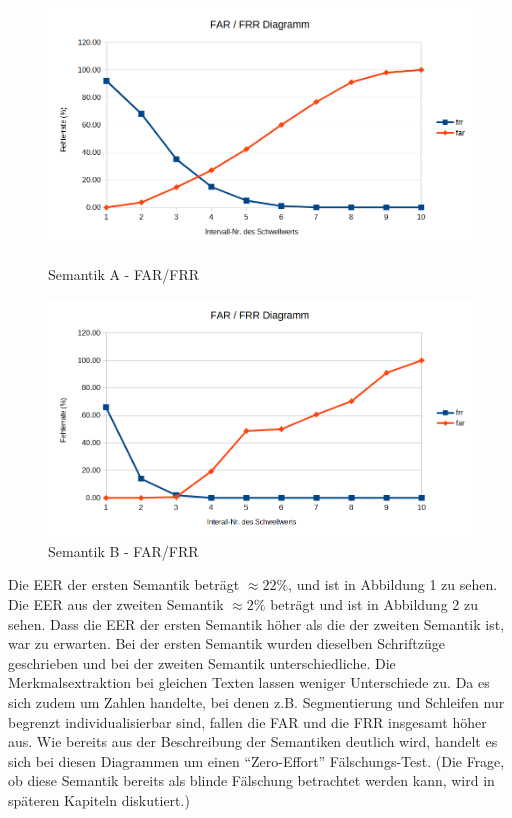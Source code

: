 \documentclass{article}
\begin{document}
\begin{figure}[ht]
	\centering
	\begin{minipage}{0.4\textwidth}
		\centering
		\includegraphics[width=\linewidth]{assets/a-eer}
		\caption{Semantik A - FAR/FRR}
	\end{minipage}%
	\hspace{1em}
	\begin{minipage}{.4\textwidth}
		\centering
		\includegraphics[width=\linewidth]{assets/b-eer}
		\caption{Semantik B - FAR/FRR}
		\label{fig:test2}
	\end{minipage}
\end{figure}


Die EER der ersten Semantik beträgt $\approx22\%$, und ist in Abbildung 1 zu sehen. Die EER aus der
zweiten Semantik $\approx2\%$ beträgt und ist in Abbildung 2 zu sehen. Dass die EER der ersten Semantik
höher als die der zweiten Semantik ist, war zu erwarten. Bei der ersten Semantik wurden dieselben Schriftzüge
geschrieben und bei der zweiten Semantik unterschiedliche. Die Merkmalsextraktion bei gleichen Texten
lassen weniger Unterschiede zu. Da es sich zudem um Zahlen handelte, bei denen z.B. Segmentierung und
Schleifen nur begrenzt individualisierbar sind, fallen die FAR und die FRR insgesamt höher aus. Wie
bereits aus der Beschreibung der Semantiken deutlich wird, handelt es sich bei diesen Diagrammen um
einen ``Zero-Effort'' Fälschungs-Test. (Die Frage, ob diese Semantik bereits als blinde Fälschung
betrachtet werden kann, wird in späteren Kapiteln diskutiert.)
\end{document}
